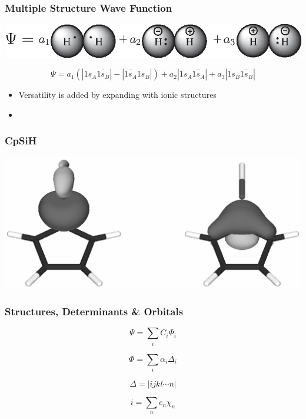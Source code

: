 \documentclass[]{beamer}
\begin{document}
\begin{frame}
  \frametitle{Multiple Structure Wave Function}
  \begin{center}
    \includegraphics[scale=0.95]{figures/heitlerplus.eps}
  \end{center}
  \begin{equation*}
    \Psi=a_1(|1s_{A}\overline{1s_{B}}| - |\overline{1s_{A}}1s_{B}|) + a_2 |1s_{A}\overline{1s_{A}}| + a_3 |1s_{B}\overline{1s_{B}}|
  \end{equation*}
  \begin{itemize}
  \item<1-> Versatility is added by expanding with ionic structures
  \item<2-> 
  \end{itemize}
\end{frame}

\begin{frame}
  \frametitle{CpSiH}
  \begin{center}
    \includegraphics[scale=0.5]{figures/sigma_sih.eps}
  \end{center}
\end{frame}
\begin{frame}
  \frametitle{Structures, Determinants \& Orbitals}
  \begin{equation*}
    \Psi = \sum_{i} C_i \Phi_i
  \end{equation*}

  \begin{equation*}
    \Phi = \sum_{i} \alpha_i \Delta_i
  \end{equation*}

  \begin{equation*}
    \Delta = |ijkl \cdots n|
  \end{equation*}

  \begin{equation*}
    i = \sum_{n} c_n \chi_n
  \end{equation*}
\end{frame}
\end{document}
